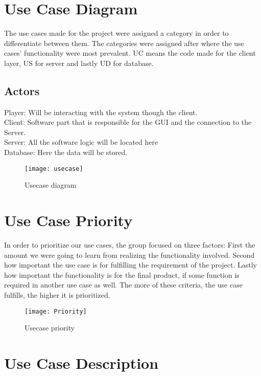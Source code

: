 \section{Use Case Diagram}

The use cases made for the project were assigned a category in order to
 differentiate between them. The categories were assigned after where the
  use cases’ functionality were most prevalent. UC means the code made for
   the client layer, US for server and lastly UD for database.

\subsection{Actors}

Player: Will be interacting with the system though the client.\\
Client: Software part that is responsible for the GUI and the connection
 to the Server. \\
Server: All the software logic will be located here\\
Database: Here the data will be stored.

\begin{figure}[h]
\centering
\texttt{[image: usecase]}
\caption{Usecase diagram}
\end{figure}
\clearpage

\section{Use Case Priority}

In order to prioritize our use cases, the group focused on three factors:
 First the amount we were going to learn from realizing the functionality
  involved. Second how important the use case is for fulfilling the
   requirement of the project. Lastly how important the functionality
    is for the final product, if some function is required in another
     use case as well. The more of these criteria, the use case fulfills,
      the higher it is prioritized.

\begin{figure}[h]
\centering
\texttt{[image: Priority]}
\caption{Usecase priority}
\end{figure}

\section{Use Case Description}

